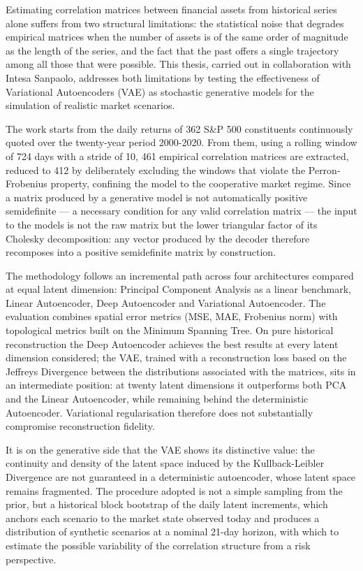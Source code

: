 Estimating correlation matrices between financial assets from historical series alone suffers from two structural limitations: the statistical noise that degrades empirical matrices when the number of assets is of the same order of magnitude as the length of the series, and the fact that the past offers a single trajectory among all those that were possible. This thesis, carried out in collaboration with Intesa Sanpaolo, addresses both limitations by testing the effectiveness of Variational Autoencoders (VAE) as stochastic generative models for the simulation of realistic market scenarios.

The work starts from the daily returns of 362 S\&P 500 constituents continuously quoted over the twenty-year period 2000-2020. From them, using a rolling window of 724 days with a stride of 10, 461 empirical correlation matrices are extracted, reduced to 412 by deliberately excluding the windows that violate the Perron-Frobenius property, confining the model to the cooperative market regime. Since a matrix produced by a generative model is not automatically positive semidefinite --- a necessary condition for any valid correlation matrix --- the input to the models is not the raw matrix but the lower triangular factor of its Cholesky decomposition: any vector produced by the decoder therefore recomposes into a positive semidefinite matrix by construction.

The methodology follows an incremental path across four architectures compared at equal latent dimension: Principal Component Analysis as a linear benchmark, Linear Autoencoder, Deep Autoencoder and Variational Autoencoder. The evaluation combines spatial error metrics (MSE, MAE, Frobenius norm) with topological metrics built on the Minimum Spanning Tree. On pure historical reconstruction the Deep Autoencoder achieves the best results at every latent dimension considered; the VAE, trained with a reconstruction loss based on the Jeffreys Divergence between the distributions associated with the matrices, sits in an intermediate position: at twenty latent dimensions it outperforms both PCA and the Linear Autoencoder, while remaining behind the deterministic Autoencoder. Variational regularisation therefore does not substantially compromise reconstruction fidelity.

It is on the generative side that the VAE shows its distinctive value: the continuity and density of the latent space induced by the Kullback-Leibler Divergence are not guaranteed in a deterministic autoencoder, whose latent space remains fragmented. The procedure adopted is not a simple sampling from the prior, but a historical block bootstrap of the daily latent increments, which anchors each scenario to the market state observed today and produces a distribution of synthetic scenarios at a nominal 21-day horizon, with which to estimate the possible variability of the correlation structure from a risk perspective.

